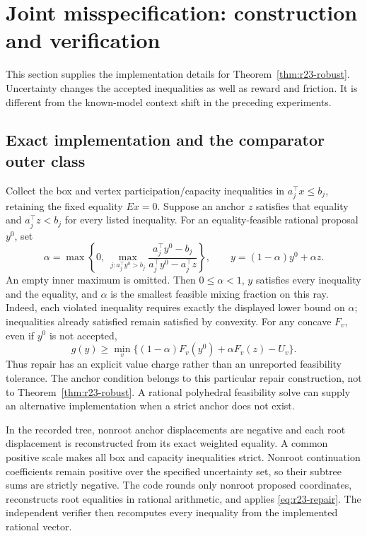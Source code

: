 \documentclass[11pt,letterpaper]{article}
\theoremstyle{definition}
\newcommand{\1}{\mathbf 1}
\begin{document}
\section{Joint misspecification: construction and verification}\label{ec:r23-robust}
This section supplies the implementation details for Theorem~\ref{thm:r23-robust}. Uncertainty changes the accepted inequalities as well as reward and friction. It is different from the known-model context shift in the preceding experiments.

\subsection{Exact implementation and the comparator outer class}
Collect the box and vertex participation/capacity inequalities in $a_j^\top x\leq b_j$, retaining the fixed equality $Ex=0$. Suppose an anchor $z$ satisfies that equality and $a_j^\top z<b_j$ for every listed inequality. For an equality-feasible rational proposal $y^0$, set
\begin{equation}\label{eq:r23-repair}
 \alpha=\max\left\{0,\ \max_{j:a_j^\top y^0>b_j}
 \frac{a_j^\top y^0-b_j}{a_j^\top y^0-a_j^\top z}\right\},\qquad
 y=(1-\alpha)y^0+\alpha z.
\end{equation}
An empty inner maximum is omitted. Then $0\leq\alpha<1$, $y$ satisfies every inequality and the equality, and $\alpha$ is the smallest feasible mixing fraction on this ray. Indeed, each violated inequality requires exactly the displayed lower bound on $\alpha$; inequalities already satisfied remain satisfied by convexity. For any concave $F_v$, even if $y^0$ is not accepted,
\[
 g(y)\geq\min_v\{(1-\alpha)F_v(y^0)+\alpha F_v(z)-U_v\}.
\]
Thus repair has an explicit value charge rather than an unreported feasibility tolerance. The anchor condition belongs to this particular repair construction, not to Theorem~\ref{thm:r23-robust}. A rational polyhedral feasibility solve can supply an alternative implementation when a strict anchor does not exist.

In the recorded tree, nonroot anchor displacements are negative and each root displacement is reconstructed from its exact weighted equality. A common positive scale makes all box and capacity inequalities strict. Nonroot continuation coefficients remain positive over the specified uncertainty set, so their subtree sums are strictly negative. The code rounds only nonroot proposed coordinates, reconstructs root equalities in rational arithmetic, and applies \eqref{eq:r23-repair}. The independent verifier then recomputes every inequality from the implemented rational vector.
\end{document}
